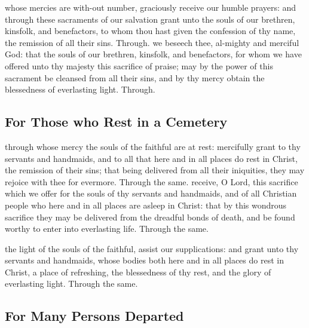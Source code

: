 \begin{multicols}{2}
   \newcolumn

\secret
{} whose mercies are with-out number, graciously receive our humble prayers: and through these sacraments of our salvation grant unto the souls of our brethren, kinsfolk, and benefactors, to whom thou hast given the confession of thy name, the remission of all their sins. Through.
\postcommunion
{} we beseech thee, al-mighty and merciful God: that the souls of our brethren, kinsfolk, and benefactors, for whom we have offered unto thy majesty this sacrifice of praise; may by the power of this sacrament be cleansed from all their sins, and by thy mercy obtain the blessedness of everlasting light.
Through.

\subsection{For Those who Rest in a Cemetery}
\collect
{} through whose mercy the souls of the faithful are at rest: mercifully grant to thy servants and handmaids, and to all that here and in all places do rest in Christ, the remission of their sins; that being delivered from all their iniquities, they may rejoice with thee for evermore. Through the same.
\secret
{} receive, O Lord, this sacrifice which we offer for the souls of thy servants and handmaids, and of all Christian people who here and in all places are asleep in Christ: that by this wondrous sacrifice they may be delivered from the dreadful bonds of death, and be found worthy to enter into everlasting life. Through the same.

\vspace{-0.25\baselineskip}

\postcommunion
{} the light of the souls of the faithful, assist our supplications: and grant unto thy servants and handmaids, whose bodies both here and in all places do rest in Christ, a place of refreshing, the blessedness of thy rest, and the glory of everlasting light. Through the same.

\vspace{-0.25\baselineskip}

\subsection{For Many Persons Departed}

\vspace{-0.25\baselineskip}


\end{multicols}
